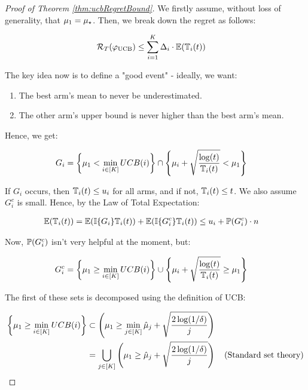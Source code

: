 \begin{proof}[Proof of Theorem \ref{thm:ucbRegretBound}]

We firstly assume, without loss of generality, that $\mu_{1} = \mu_{\star}$. Then, we break down the regret as follows:

\begin{align*}
\mathcal{R}_{T}(\varphi_{\mathrm{UCB}}) &\leq \sum_{i=1}^{K} \Delta_{i} \cdot \mathbb{E}(\mathbb{T}_{i}(t))
\end{align*}

The key idea now is to define a "good event" - ideally, we want:

\begin{enumerate}
    \item The best arm's mean to never be underestimated.
    \item The other arm's upper bound is never higher than the best arm's mean.
\end{enumerate}

Hence, we get:

\begin{align*}
G_i &= \left\{ \mu_{1} < \min_{i \in [K]} UCB(i) \right\}
\cap \left\{ \mu_{i} + \sqrt{\frac{\log(t)}{\mathbb{T}_{i}(t)}} < \mu_1 \right\}
\end{align*}

If $G_i$ occurs, then $\mathbb{T}_{i}(t) \leq u_i$ for all arms, and if not, $\mathbb{T}_{i}(t) \leq t$. We also assume $G_i^c$ is small. Hence, by the Law of Total Expectation:

\begin{align*}
\mathbb{E}(\mathbb{T}_{i}(t)) &= \mathbb{E}(\mathbb{I}\{G_i\}\mathbb{T}_{i}(t)) + \mathbb{E}(\mathbb{I}\{G_i^c\}\mathbb{T}_{i}(t)) \leq u_i + \mathbb{P}(G_i^c) \cdot n
\end{align*}

Now, $\mathbb{P}(G_i^c)$ isn't very helpful at the moment, but:

\begin{align*}
G_i^c &= \left\{\mu_{1} \geq \min_{i \in [K]} UCB(i)\right\}
\cup \left\{\mu_{i} + \sqrt{\frac{\log(t)}{\mathbb{T}_{i}(t)}} \geq \mu_1 \right\}
\end{align*}

The first of these sets is decomposed using the definition of UCB:

\begin{align*}
\left\{ \mu_1 \geq \min_{i \in [K]} UCB(i) \right\}
&\subset \left( \mu_1 \geq \min_{j \in [K]} \hat{\mu}_j + \sqrt{\frac{2\log(1/\delta)}{j}} \right)\\
&= \bigcup_{j \in [K]} \left( \mu_1 \geq \hat{\mu}_j + \sqrt{\frac{2\log(1/\delta)}{j}} \right) \quad \text{(Standard set theory)}
\end{align*}


\end{proof}

